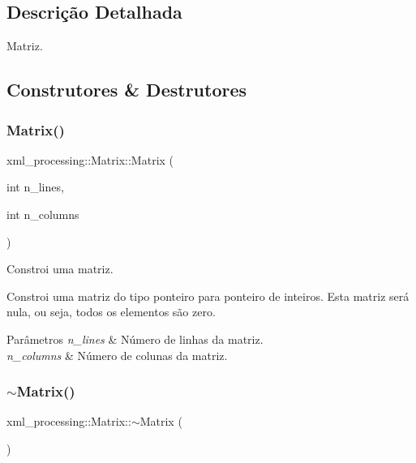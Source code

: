 \subsection{Descrição Detalhada}
Matriz. 

\subsection{Construtores \& Destrutores}
\mbox{\label{classxml__processing_1_1Matrix_a5862906904cd901685f72cc703084d83}} 
\subsubsection{\texorpdfstring{Matrix()}{Matrix()}}
{\footnotesize\ttfamily xml\+\_\+processing\+::\+Matrix\+::\+Matrix (\begin{DoxyParamCaption}\item[{int}]{n\+\_\+lines,  }\item[{int}]{n\+\_\+columns }\end{DoxyParamCaption})}



Constroi uma matriz. 

Constroi uma matriz do tipo ponteiro para ponteiro de inteiros. Esta matriz será nula, ou seja, todos os elementos são zero.


\begin{DoxyParams}{Parâmetros}
{\em n\+\_\+lines} & Número de linhas da matriz. \\
\hline
{\em n\+\_\+columns} & Número de colunas da matriz. \\
\hline
\end{DoxyParams}
\mbox{\label{classxml__processing_1_1Matrix_a38b41757af695c49ed75cdfabfd85c55}} 
\subsubsection{\texorpdfstring{$\sim$\+Matrix()}{~Matrix()}}
{\footnotesize\ttfamily xml\+\_\+processing\+::\+Matrix\+::$\sim$\+Matrix (\begin{DoxyParamCaption}{ }\end{DoxyParamCaption})}



